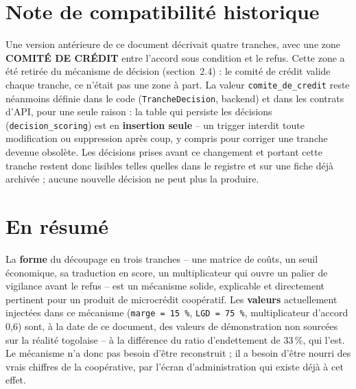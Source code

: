 \documentclass[11pt,a4paper]{article}
\newcommand{\tranche}[2]{\textcolor{#1}{\textbf{#2}}}
\begin{document}
\section*{Note de compatibilité historique}

Une version antérieure de ce document décrivait quatre tranches, avec une zone
\tranche{orangevigilance}{COMITÉ DE CRÉDIT} entre l'accord sous condition et le refus. Cette
zone a été retirée du mécanisme de décision (section~2.4) : le comité de crédit valide chaque
tranche, ce n'était pas une zone à part. La valeur \texttt{comite\_de\_credit} reste néanmoins
définie dans le code (\texttt{TrancheDecision}, backend) et dans les contrats d'API, pour une
seule raison : la table qui persiste les décisions (\texttt{decision\_scoring}) est en
\textbf{insertion seule} -- un trigger interdit toute modification ou suppression après coup, y
compris pour corriger une tranche devenue obsolète. Les décisions prises avant ce changement et
portant cette tranche restent donc lisibles telles quelles dans le registre et sur une fiche déjà
archivée ; aucune nouvelle décision ne peut plus la produire.

\section*{En résumé}

La \textbf{forme} du découpage en trois tranches -- une matrice de coûts, un seuil économique, sa
traduction en score, un multiplicateur qui ouvre un palier de vigilance avant le refus -- est un
mécanisme solide, explicable et directement pertinent pour un produit de microcrédit coopératif.
Les \textbf{valeurs} actuellement injectées dans ce mécanisme (\texttt{marge = 15\,\%},
\texttt{LGD = 75\,\%}, multiplicateur d'accord 0,6) sont, à la date de ce document, des valeurs de
démonstration non sourcées sur la réalité togolaise -- à la différence du ratio d'endettement de
33\,\%, qui l'est. Le mécanisme n'a donc pas besoin d'être reconstruit ; il a besoin d'être nourri
des vrais chiffres de la coopérative, par l'écran d'administration qui existe déjà à cet effet.
\end{document}
